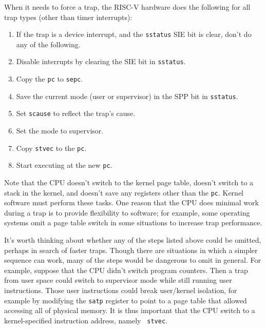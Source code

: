 When it needs to force a trap, the RISC-V hardware does the
following for all trap types (other than timer interrupts):

\begin{enumerate}

\item If the trap is a device interrupt, and the {\tt sstatus} SIE bit
  is clear, don't do any of the following.

\item Disable interrupts by clearing the SIE bit in {\tt sstatus}.

\item Copy the {\tt pc} to {\tt sepc}.

\item Save the current mode (user or supervisor) in the SPP bit in {\tt sstatus}.

\item Set {\tt scause} to reflect the trap's cause.

\item Set the mode to supervisor.

\item Copy {\tt stvec} to the {\tt pc}.

\item Start executing at the new {\tt pc}.

\end{enumerate}

Note that the CPU doesn't switch to the kernel page table, doesn't
switch to a stack in the kernel, and doesn't save any registers other
than the {\tt pc}. Kernel software must perform these tasks.
One reason that the CPU does minimal work during a trap is to provide
flexibility to software; for example, some operating systems 
omit a page table switch in some situations to increase
trap performance.

It's worth thinking about whether any of the steps listed above could
be omitted, perhaps in search of faster traps. Though there are
situations in which a simpler sequence can work, many of the steps
would be dangerous to omit in general. For example, suppose that the
CPU didn't switch program counters. Then a trap from user space could
switch to supervisor mode while still running user instructions. Those
user instructions could break user/kernel isolation, for example
by modifying the {\tt satp} register to point to a page table that
allowed accessing all of physical memory. It is thus important that
the CPU switch to a kernel-specified instruction address, namely {\tt
  stvec}.

